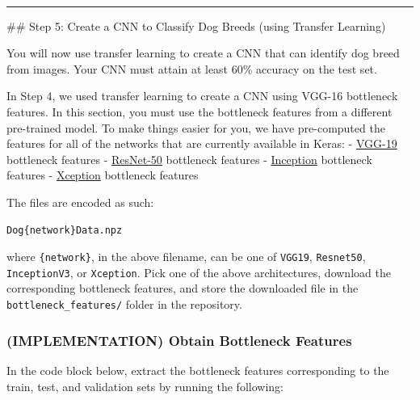 \documentclass[11pt]{article}
\begin{document}
    \begin{center}
    \end{center}
    { \hspace*{\fill} \\}
    
    \begin{center}\rule{0.5\linewidth}{\linethickness}\end{center}

 \#\# Step 5: Create a CNN to Classify Dog Breeds (using Transfer
Learning)

You will now use transfer learning to create a CNN that can identify dog
breed from images. Your CNN must attain at least 60\% accuracy on the
test set.

In Step 4, we used transfer learning to create a CNN using VGG-16
bottleneck features. In this section, you must use the bottleneck
features from a different pre-trained model. To make things easier for
you, we have pre-computed the features for all of the networks that are
currently available in Keras: -
\href{https://s3-us-west-1.amazonaws.com/udacity-aind/dog-project/DogVGG19Data.npz}{VGG-19}
bottleneck features -
\href{https://s3-us-west-1.amazonaws.com/udacity-aind/dog-project/DogResnet50Data.npz}{ResNet-50}
bottleneck features -
\href{https://s3-us-west-1.amazonaws.com/udacity-aind/dog-project/DogInceptionV3Data.npz}{Inception}
bottleneck features -
\href{https://s3-us-west-1.amazonaws.com/udacity-aind/dog-project/DogXceptionData.npz}{Xception}
bottleneck features

The files are encoded as such:

\begin{verbatim}
Dog{network}Data.npz
\end{verbatim}

where \texttt{\{network\}}, in the above filename, can be one of
\texttt{VGG19}, \texttt{Resnet50}, \texttt{InceptionV3}, or
\texttt{Xception}. Pick one of the above architectures, download the
corresponding bottleneck features, and store the downloaded file in the
\texttt{bottleneck\_features/} folder in the repository.

\subsubsection{(IMPLEMENTATION) Obtain Bottleneck
Features}\label{implementation-obtain-bottleneck-features}

In the code block below, extract the bottleneck features corresponding
to the train, test, and validation sets by running the following:
\end{document}
